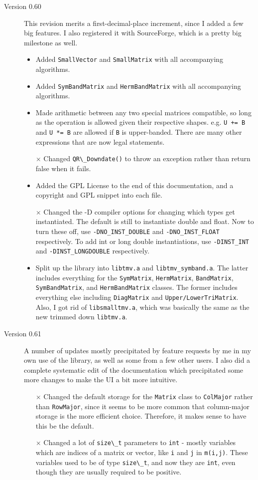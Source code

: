\documentclass[twoside,letterpaper,11pt]{article}
\renewcommand{\tt}[1]{{\lstinline {#1}}}
\begin{document}
\begin{description}
\item[Version 0.60]
This revision merits a first-decimal-place increment, since I added a 
few big features.  I also registered it with SourceForge, 
which is a pretty big milestone as well.
\begin{itemize}
\item
Added \tt{SmallVector} and \tt{SmallMatrix} with all accompanying algorithms.
\item 
Added \tt{SymBandMatrix} and \tt{HermBandMatrix} with all accompanying algorithms.
\item
Made arithmetic between any two special matrices compatible, so long as 
the operation is allowed given their respective shapes.  
e.g. \tt{U += B} and \tt{U *= B} are allowed if \tt{B} is upper-banded.  
There are many other expressions that are now legal statements.
\item[$\times$]
Changed \tt{QR\_Downdate()} to throw an exception rather than return false
when it fails.
\item
Added the GPL License to the end of this documentation, and a copyright
and GPL snippet into each file.
\item[$\times$]
Changed the -D compiler options for changing which types get instantiated.
The default is still to instantiate double and float.  Now to turn these
off, use \texttt{-DNO\_INST\_DOUBLE} and \texttt{-DNO\_INST\_FLOAT} respectively.  To
add int or long double instantiations, use \texttt{-DINST\_INT} and 
\texttt{-DINST\_LONGDOUBLE} respectively.
\item
Split up the library into \texttt{libtmv.a} and \texttt{libtmv\_symband.a}.  The
latter includes everything for the \tt{SymMatrix}, \tt{HermMatrix}, 
\tt{BandMatrix}, \tt{SymBandMatrix}, and \tt{HermBandMatrix} classes.
The former includes everything else including \tt{DiagMatrix} and
\tt{Upper/LowerTriMatrix}.  Also, I got rid of \texttt{libsmalltmv.a}, which
was basically the same as the new trimmed down \texttt{libtmv.a}.

\end{itemize}

\item[Version 0.61]
A number of updates mostly precipitated by feature requests by me in my own
use of the library, as well as some from a few other users.
I also did a complete systematic edit of the documentation which 
precipitated some more changes to make the UI a bit more intuitive.
\begin{itemize}
\item[$\times$]
Changed the default storage for the \tt{Matrix} class to \tt{ColMajor}
rather than \tt{RowMajor}, since it seems to be more common that column-major
storage is the more efficient choice.  Therefore, it makes sense to have this
be the default.
\item[$\times$]
Changed a lot of \tt{size\_t} parameters to \tt{int} - mostly variables
which are indices of a matrix or vector, like \tt{i} and \tt{j} in \tt{m(i,j)}.  
These variables used to be of type \tt{size\_t}, and now they are \tt{int},
even though they are usually required to be positive.


\end{itemize}
\end{description}
\end{document}
